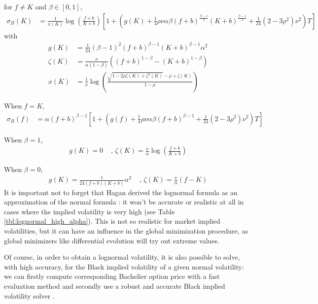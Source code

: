 \documentclass[]{rAMF2e}
\begin{document}
for $f \neq K$ and $\beta \in [0,1]$,
\begin{align}
\sigma_B(K) &= \frac{1}{x(K)}\log\left(\frac{f+b}{K+b}\right)\left[1+\left(g(K)+\frac{1}{4}\rho\nu\alpha\beta(f+b)^{\frac{\beta-1}{2}}(K+b)^{\frac{\beta-1}{2}}+\frac{1}{24}(2-3\rho^2)\nu^2\right)T\right]
\end{align}
with 
\begin{align*}
g(K) &= \frac{1}{24} (\beta-1)^2 (f+b)^{\beta-1} (K+b)^{\beta-1} \alpha^2\\
\zeta(K) &= \frac{\nu}{\alpha (1-\beta)} \left( (f+b)^{1-\beta} - (K+b)^{1-\beta} \right)\\
x(K) &= \frac{1}{\nu}\log\left(\frac{\sqrt{1-2\rho\zeta(K)+\zeta^2(K)}-\rho+\zeta(K)}{1-\rho} \right)
\end{align*}

When $f=K$, 
\begin{align}
\sigma_B(f) &= \alpha (f+b)^{\beta-1} \left[1+\left(g(f)+\frac{1}{4}\rho\nu\alpha\beta(f+b)^{\beta-1}+\frac{1}{24}(2-3\rho^2)\nu^2\right)T\right]
\end{align}

When $\beta = 1$,
\begin{align*}
g(K) = 0 &\texttt{ , } \zeta(K) = \frac{\nu}{\alpha} \log\left(\frac{f+b}{K+b}\right)
\end{align*}

When $\beta = 0$,
\begin{align*}
g(K) = \frac{1}{24(f+b)(K+b)}\alpha^2 &\texttt{ , }\zeta(K) = \frac{\nu}{\alpha} \left(f-K\right)
\end{align*}
It is important not to forget that Hagan derived the lognormal formula as an approximation of the normal formula \citep{hagan2002managing}: it won't be accurate or realistic at all in cases where the implied volatility is very high (see Table \ref{tbl:lognormal_high_alpha}). This is not so realistic for market implied volatilities, but it can have an influence in the global minimization procedure, as global minimizers like differential evolution will try out extreme values.

Of course, in order to obtain a lognormal volatility, it is also possible to solve, with high accuracy, for the Black implied volatility of a given normal volatility: we can firstly compute corresponding Bachelier option price with a fast evaluation method \citep{lefloch2014bpvol} and secondly use a robust and accurate Black implied volatility solver \citep{jackel2013let, li2011adaptive}.
\end{document}
